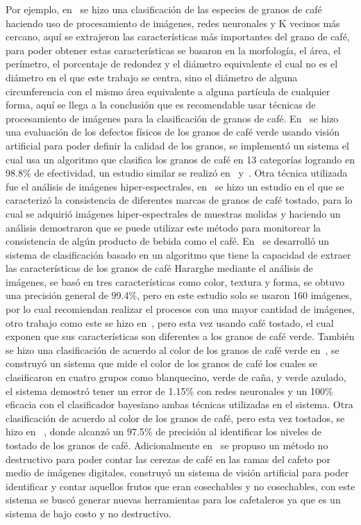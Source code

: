 \documentclass[12pt,a4paper,oneside]{book}
\begin{document}
Por ejemplo, en~\cite{Arboleda2018} se hizo una clasificación de las especies de granos de café haciendo uso de procesamiento de imágenes, redes neuronales y K vecinos más cercano, aquí se extrajeron las características más importantes del grano de café, para poder obtener estas características se basaron en la morfología, el área, el perímetro, el porcentaje de redondez y el diámetro equivalente el cual no es el diámetro en el que este trabajo se centra, sino el diámetro de alguna circunferencia con el mismo área equivalente a alguna partícula de cualquier forma, aquí se llega a la conclusión que es recomendable usar técnicas de procesamiento de imágenes para la clasificación de granos de café. En~\cite{Portugal2016} se hizo una evaluación de los defectos físicos de los granos de café verde usando visión artificial para poder definir la calidad de los granos, se implementó un sistema el cual usa un algoritmo que clasifica los granos de café en 13 categorías logrando en 98.8\% de efectividad, un estudio similar se realizó en~\cite{Carrillo2009} y~\cite{RamirezTicona2016}. Otra técnica utilizada fue el análisis de imágenes hiper-espectrales, en~\cite{Nansen2016} se hizo un estudio en el que se caracterizó la consistencia de diferentes marcas de granos de café tostado, para lo cual se adquirió imágenes hiper-espectrales de muestras molidas y haciendo un análisis demostraron que se puede utilizar este método para monitorear la consistencia de algún producto de bebida como el café. En~\cite{Girma2013} se desarrolló un sistema de clasificación basado en un algoritmo que tiene la capacidad de extraer las características de los granos de café Hararghe mediante el análisis de imágenes, se basó en tres características como color, textura y forma, se obtuvo una precisión general de 99.4\%, pero en este estudio solo se usaron 160 imágenes, por lo cual recomiendan realizar el procesos con una mayor cantidad de imágenes, otro trabajo como este se hizo en~\cite{Birhanu2015}, pero esta vez usando café tostado, el cual exponen que sus características son diferentes a los granos de café verde. También se hizo una clasificación de acuerdo al color de los granos de café verde en~\cite{Oliveira2016}, se construyó un sistema que mide el color de los granos de café los cuales se clasificaron en cuatro grupos como blanquecino, verde de caña, y verde azulado, el sistema demostró tener un error de 1.15\% con redes neuronales y un 100\% eficacia con el clasificador bayesiano ambas técnicas utilizadas en el sistema. Otra clasificación de acuerdo al color de los granos de café, pero esta vez tostados, se hizo en ~\cite{Nasution2017}, donde alcanzó un 97.5\% de precisión al identificar los niveles de tostado de los granos de café. Adicionalmente en~\cite{Ramos2017} se propuso un método no destructivo para poder contar las cerezas de café en las ramas del cafeto por medio de imágenes digitales, construyó un sistema de visión artificial para poder identificar y contar aquellos frutos que eran cosechables y no cosechables, con este sistema se buscó generar nuevas herramientas para los cafetaleros ya que es un sistema de bajo costo y no destructivo.
\end{document}
